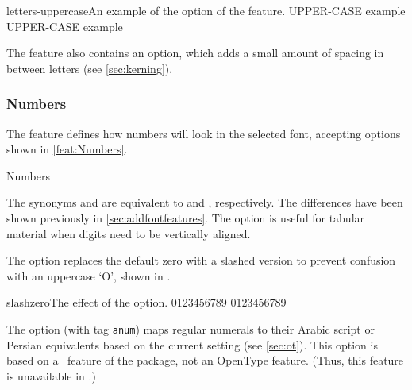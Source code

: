 \documentclass[a4paper]{l3doc}
\begin{document}
\begin{Lexample}{letters-uppercase}{An example of the  option of the  feature.}
   UPPER-CASE example \\
   UPPER-CASE example
\end{Lexample}

The  feature also contains an  option,
which adds a small amount of spacing in between letters (see \vref{sec:kerning}).

\subsubsection{Numbers}

The  feature defines how numbers will look in the
selected font, accepting options shown in \ref{feat:Numbers}.

\begin{features}{Numbers}
\end{features}

The synonyms
 and  are equivalent to  and
, respectively.
The differences have been shown previously
in \vref{sec:addfontfeatures}.
The  option is useful for tabular material when digits need
to be vertically aligned.

The  option
replaces the default zero with a slashed version to prevent
confusion with an uppercase `O', shown in .

\begin{Lexample}{slashzero}{The effect of the  option.}
   0123456789
   0123456789
\end{Lexample}

The  option (with tag \verb|anum|) maps regular numerals to their Arabic script or Persian equivalents
based on the current  setting (see \vref{sec:ot}).
This option is based on a \LuaTeX\ feature of the  package,
not an OpenType feature. (Thus, this feature is unavailable in \XeTeX.)
\end{document}
